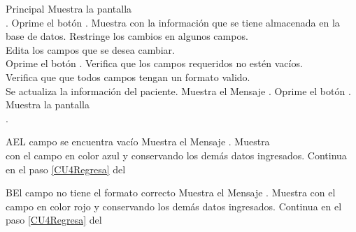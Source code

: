\begin{UCtrayectoria}{Principal}
    \UCpaso Muestra la pantalla \\.
    \UCpaso[\UCactor] Oprime el botón .
    \UCpaso Muestra  con la información que se tiene almacenada en la base de datos.
    \UCpaso Restringe los cambios en algunos campos.
        \\
    \UCpaso[\UCactor] Edita los campos que se desea cambiar.\label{CU4Regresa}
    	\\ 
	\UCpaso[\UCactor] Oprime el botón . 
	\UCpaso Verifica que los campos requeridos no estén vacíos.
	    \\
	\UCpaso Verifica que que todos campos tengan un formato valido.
	    \\
	\UCpaso Se actualiza la información del paciente.  \label{CU4Regresa2}
	\UCpaso Muestra el Mensaje \textbf{}.
    \UCpaso[\UCactor] Oprime el botón .
	\UCpaso Muestra la pantalla \\.
\end{UCtrayectoria}


\begin{UCtrayectoriaA}{A}{EL campo se encuentra vacío}
	\UCpaso Muestra el Mensaje \textbf{}.
    \UCpaso Muestra \\ con el campo en color azul y conservando los demás datos ingresados.
    \UCpaso Continua en el paso \ref{CU4Regresa} del 
\end{UCtrayectoriaA}
		
\begin{UCtrayectoriaA}{B}{El campo no tiene el formato correcto}
    \UCpaso Muestra el Mensaje \textbf{}.
    \UCpaso Muestra  con el campo en color rojo y conservando los demás datos ingresados.
	\UCpaso Continua en el paso \ref{CU4Regresa} del 
\end{UCtrayectoriaA}

